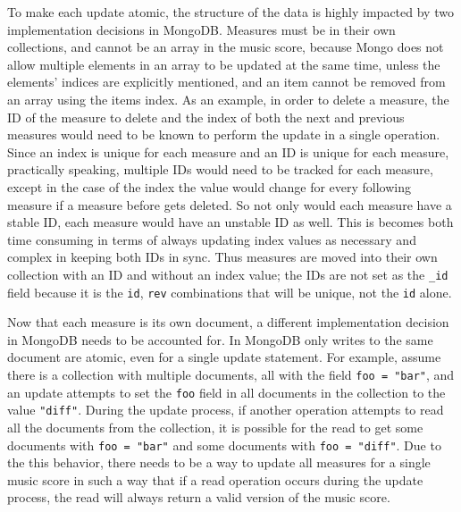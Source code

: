 \documentclass[letterpaper,12pt]{article}
\begin{document}
To make each update atomic, the structure of the data is highly impacted by two implementation decisions in MongoDB.
Measures must be in their own collections, and cannot be an array in the music score, because Mongo does not allow
multiple elements in an array to be updated at the same time, unless the elements' indices are explicitly mentioned, and
an item cannot be removed from an array using the items index. As an example, in order to delete a measure, the ID of
the measure to delete and the index of both the next and previous measures would need to be known to perform the update
in a single operation. Since an index is unique for each measure and an ID is unique for each measure, practically
speaking, multiple IDs would need to be tracked for each measure, except in the case of the index the value would change
for every following measure if a measure before gets deleted. So not only would each measure have a stable ID, each
measure would have an unstable ID as well. This is becomes both time consuming in terms of always updating index values
as necessary and complex in keeping both IDs in sync. Thus measures are moved into their own collection with an ID and
without an index value; the IDs are not set as the \lstinline{_id} field because it is the \lstinline{id},
\lstinline{rev} combinations that will be unique, not the \lstinline{id} alone.

Now that each measure is its own document, a different implementation decision in MongoDB needs to be accounted for. In
MongoDB only writes to the same document are atomic, even for a single update statement. For example, assume there is a 
collection with multiple documents, all with the field \lstinline{foo = "bar"}, and an update attempts to set the
\lstinline{foo} field in all documents in the collection to the value \lstinline{"diff"}. During the update process, if
another operation attempts to read all the documents from the collection, it is possible for the read to get some 
documents with \lstinline{foo = "bar"} and some documents with \lstinline{foo = "diff"}. Due to the this behavior, there
needs to be a way to update all measures for a single music score in such a way that if a read operation occurs during
the update process, the read will always return a valid version of the music score.
\end{document}

